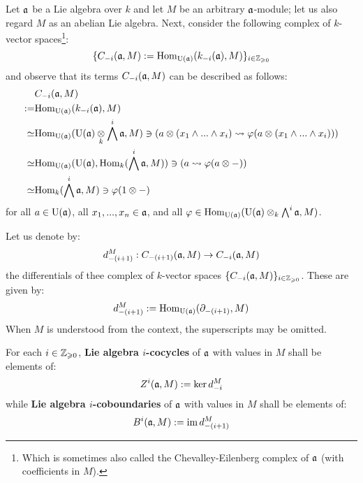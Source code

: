         \begin{remark} \label{remark: simplified_chevalley_eilenberg_complexes}
            Let $\mathfrak{a}$ be a Lie algebra over $k$ and let $M$ be an arbitrary $\mathfrak{a}$-module; let us also regard $M$ as an abelian Lie algebra. Next, consider the following complex of $k$-vector spaces\footnote{Which is sometimes also called the Chevalley-Eilenberg complex of $\mathfrak{a}$ (with coefficients in $M$).}:
                $$\{ C_{-i}(\mathfrak{a}, M) := \mathrm{Hom}_{\mathrm{U}(\mathfrak{a})}(k_{-i}(\mathfrak{a}), M) \}_{i \in \mathbb{Z}_{\geqslant 0}}$$
            and observe that its terms $C_{-i}(\mathfrak{a}, M)$ can be described as follows:
                $$
                    \begin{aligned}
                        & C_{-i}(\a, M)
                        \\
                        := & \Hom_{\rmU(\a)}(k_{-i}(\a), M)
                        \\
                        \cong & \Hom_{\rmU(\a)}( \rmU(\a) \tensor_k \bigwedge^i \a, M ) \ni \left( a \tensor (x_1 \wedge ... \wedge x_i) \mapsto \varphi( a \tensor (x_1 \wedge ... \wedge x_i) ) \right)
                        \\
                        \cong & \Hom_{\rmU(\a)}( \rmU(\a), \Hom_k( \bigwedge^i \a, M ) ) \ni \left( a \mapsto \varphi(a \tensor -) \right)
                        \\
                        \cong & \Hom_k( \bigwedge^i \a, M ) \ni \varphi(1 \tensor -)
                    \end{aligned}
                $$
            for all $a \in \mathrm{U}(\mathfrak{a})$, all $x_1, ..., x_n \in \mathfrak{a}$, and all $\varphi \in \Hom_{\rmU(\a)}( \rmU(\a) \tensor_k \bigwedge^i \a, M )$.
        \end{remark}
        \begin{definition} \label{def: lie_cocycles_and_coboundaries}
            Let us denote by:
                $$d_{-(i + 1)}^M: C_{-(i + 1)}(\mathfrak{a}, M) \to C_{-i}(\mathfrak{a}, M)$$
            the differentials of thee complex of $k$-vector spaces $\{C_{-i}(\mathfrak{a}, M)\}_{i \in \mathbb{Z}_{\geqslant 0}}$. These are given by:
                $$d_{-(i + 1)}^M := \mathrm{Hom}_{\mathrm{U}(\mathfrak{a})}(\partial_{-(i + 1)}, M)$$
            When $M$ is understood from the context, the superscripts may be omitted.
        
            For each $i \in \mathbb{Z}_{\geqslant 0}$, \textbf{Lie algebra $i$-cocycles} of $\mathfrak{a}$ with values in $M$ shall be elements of:
                $$Z^i(\mathfrak{a}, M) := \ker d_{-i}^M$$
            while \textbf{Lie algebra $i$-coboundaries} of $\mathfrak{a}$ with values in $M$ shall be elements of:
                $$B^i(\mathfrak{a}, M) := \operatorname{im} d_{-(i + 1)}^M$$
        \end{definition}
